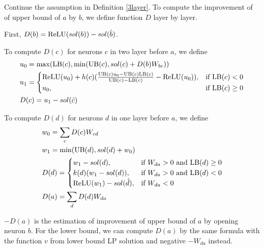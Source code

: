 \begin{definition}
	Continue the assumption in Definition \ref{3layer}. To compute the improvement of of upper bound of $a$ by $b$, we define function $D$ layer by layer.
	
	First, $D(b) = \mathrm{ReLU}(sol(b))-sol(\hat{b})$.
	
To compute $D(c)$ for neurons $c$ in two layer before $a$, we define \begin{align}
	&u_0 = \max(\mathrm{LB}(c),\min(\mathrm{UB}(c),  sol(c)+D(b)W_{bc}))\\
	&u_1 = \begin{cases}
		\mathrm{ReLU}(u_0)+h(c)(\frac{\mathrm{UB}(c)u_0-\mathrm{UB}(c)\mathrm{LB}(c)}{\mathrm{UB}(c)-\mathrm{LB}(c)}-\mathrm{ReLU}(u_0)), & \text{if }\mathrm{LB}(c) < 0\\
	u_0, & \text{if }  \mathrm{LB}(c) \geq 0
	\end{cases}\\
	&D(c) = u_1-sol(\hat{c})
\end{align}
	
	To compute $D(d)$ for neurons $d$ in one layer before $a$, we define 
	\begin{align}
		&w_0 = \sum_c D(c)W_{cd}\\
		&w_1 = \min(\mathrm{UB}(d),sol(d)+w_0)\\		
		&D(d) =
		\begin{cases}
			w_1-sol({d}), & \text{if }W_{da} > 0 \text{ and } \mathrm{LB}(d)\geq 0\\
		k(d)(w_1-sol({d})), & \text{if }W_{da} > 0 \text{ and } \mathrm{LB}(d)< 0\\
		\mathrm{ReLU}(w_1)-sol(\hat{d})	, & \text{if }  W_{da} < 0
		\end{cases}\\
		&D(a) = \sum_d D(d)W_{da}
	\end{align}
\end{definition} $-D(a)$ is the estimation of improvement of upper bound of $a$ by opening neuron $b$.  For the lower bound, we can compute $D(a)$ by the same formula with the function $v$ from lower bound LP solution and negative $-W_{da}$  instead.
		
\fi